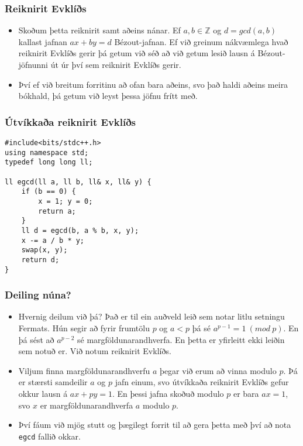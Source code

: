 \documentclass{beamer}
\begin{document}
\begin{frame}
\frametitle{Reiknirit Evklíðs}

\begin{itemize}

\item<1-> Skoðum þetta reiknirit samt aðeins nánar. Ef $a, b \in \mathbb{Z}$ og $d = gcd(a, b)$ kallast jafnan $ax + by = d$ Bézout-jafnan. Ef við greinum nákvæmlega hvað reiknirit Evklíðs gerir þá getum við séð að við getum lesið lausn á Bézout-jöfnunni út úr því sem reiknirit Evklíðs gerir.

\item<2-> Því ef við breitum forritinu að ofan bara aðeins, svo það haldi aðeins meira bókhald, þá getum við leyst þessa jöfnu frítt með.

\end{itemize}

\end{frame}

\begin{frame}[fragile]
\frametitle{Útvíkkaða reiknirit Evklíðs}

\begin{verbatim}
#include<bits/stdc++.h>
using namespace std;
typedef long long ll;

ll egcd(ll a, ll b, ll& x, ll& y) {
    if (b == 0) { 
        x = 1; y = 0; 
        return a; 
    }
    ll d = egcd(b, a % b, x, y);
    x -= a / b * y; 
    swap(x, y); 
    return d; 
}
\end{verbatim}

\end{frame}

\begin{frame}
\frametitle{Deiling núna?}

\begin{itemize}

\item<1-> Hvernig deilum við þá? Það er til ein auðveld leið sem notar litlu setningu Fermats. Hún segir að fyrir frumtölu $p$ og $a < p$ þá sé $a^{p - 1} = 1 \ (mod \ p)$. En þá sést að $a^{p - 2}$ sé margföldunarandhverfa. En þetta er yfirleitt ekki leiðin sem notuð er. Við notum reiknirit Evklíðs.

\item<2-> Viljum finna margföldunarandhverfu $a$ þegar við erum að vinna modulo $p$. Þá er stærsti samdeilir $a$ og $p$ jafn einum, svo útvíkkaða reiknirit Evklíðs gefur okkur lausn á $ax + py = 1$. En þessi jafna skoðuð modulo $p$ er bara $ax = 1$, svo $x$ er margföldunarandhverfa $a$ modulo $p$.

\item<3-> Því fáum við mjög stutt og þægilegt forrit til að gera þetta með því að nota \texttt{egcd} fallið okkar.

\end{itemize}

\end{frame}
\end{document}
